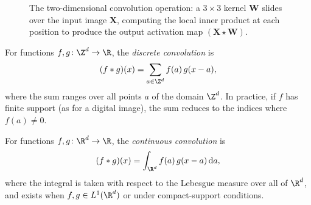 \begin{figure}[t]
\caption[The 2D convolution operation]{The two-dimensional convolution
operation: a $3 \times 3$ kernel $\mathbf{W}$ slides over the input image
$\mathbf{X}$, computing the local inner product at each position to produce the
output activation map $(\mathbf{X} \star \mathbf{W})$.}
\label{fig:grids:conv}
\end{figure}

\begin{definition}
\label{def:grids:discrete-conv}
For functions $f, g \colon \Z^d \to \R$, the \emph{discrete convolution} is
\[
  (f \conv g)(x) = \sum_{a \in \Z^d} f(a)\, g(x - a),
\]
where the sum ranges over all points $a$ of the domain $\Z^d$. In practice, if
$f$ has finite support (as for a digital image), the sum reduces to the indices
where $f(a) \neq 0$.
\end{definition}

\begin{definition}
\label{def:grids:continuous-conv}
For functions $f, g \colon \R^d \to \R$, the \emph{continuous convolution} is
\[
  (f \conv g)(x) = \int_{\R^d} f(a)\, g(x - a)\, \mathrm{d}a,
\]
where the integral is taken with respect to the Lebesgue measure over all of
$\R^d$, and exists when $f, g \in L^1(\R^d)$ or under compact-support
conditions.
\end{definition}

